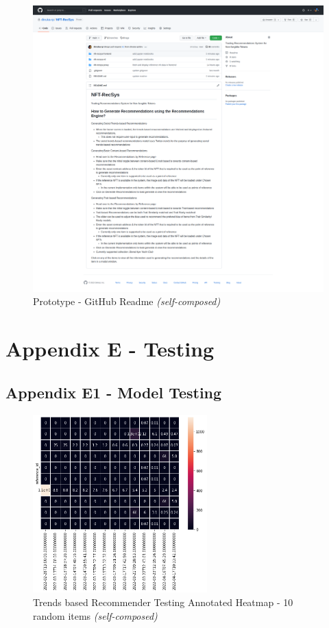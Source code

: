 \begin{figure}[h!]
\centering
\includegraphics[width=\textwidth]{images/appendix/Prototype/screencapture-github-dinuka-rp-NFT-RecSys-2022-05-19-15_54_32.png}
\caption{Prototype - GitHub Readme \textit{(self-composed)}}
\end{figure}

\chapter{Appendix E - Testing}
\label{appendix:testing}

\section*{Appendix E1 - Model Testing}

\begin{figure}[h!]
\centering
\includegraphics[width=0.6\textwidth]{images/Testing/trends/trends-heatmap-10-rand-annot.png}
\caption{Trends based Recommender Testing Annotated Heatmap - 10 random items \textit{(self-composed)}}
\label{fig:trends-recsys-heatmap-10-anot}
\end{figure}


